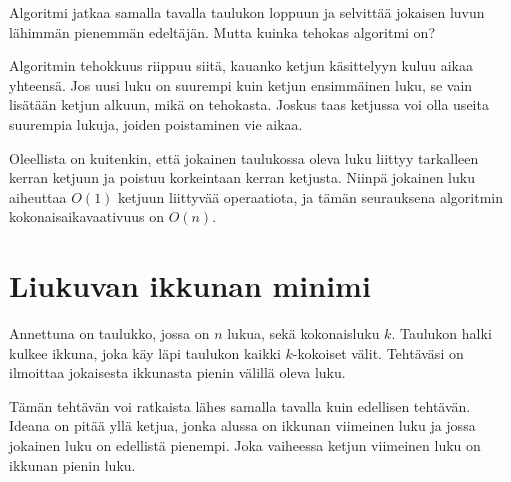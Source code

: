 \begin{center}
\end{center}

Algoritmi jatkaa samalla tavalla taulukon loppuun
ja selvittää jokaisen luvun lähimmän
pienemmän edeltäjän.
Mutta kuinka tehokas algoritmi on?

Algoritmin tehokkuus riippuu siitä,
kauanko ketjun käsittelyyn kuluu aikaa yhteensä.
Jos uusi luku on suurempi kuin ketjun ensimmäinen
luku, se vain lisätään ketjun alkuun,
mikä on tehokasta.
Joskus taas ketjussa voi olla useita
suurempia lukuja, joiden poistaminen vie aikaa.

Oleellista on kuitenkin, että jokainen
taulukossa oleva luku liittyy
tarkalleen kerran ketjuun ja poistuu
korkeintaan kerran ketjusta.
Niinpä jokainen luku aiheuttaa $O(1)$
ketjuun liittyvää operaatiota, ja tämän
seurauksena algoritmin kokonaisaikavaativuus on $O(n)$.

\section{Liukuvan ikkunan minimi}


\begin{task}
Annettuna on taulukko, jossa on $n$ lukua,
sekä kokonaisluku $k$.
Taulukon halki kulkee ikkuna, joka käy
läpi taulukon kaikki $k$-kokoiset välit.
Tehtäväsi on ilmoittaa jokaisesta ikkunasta
pienin välillä oleva luku.
\end{task}

Tämän tehtävän voi ratkaista lähes samalla
tavalla kuin edellisen tehtävän.
Ideana on pitää yllä ketjua, jonka alussa
on ikkunan viimeinen luku ja jossa jokainen
luku on edellistä pienempi. Joka vaiheessa
ketjun viimeinen luku on ikkunan pienin luku.

